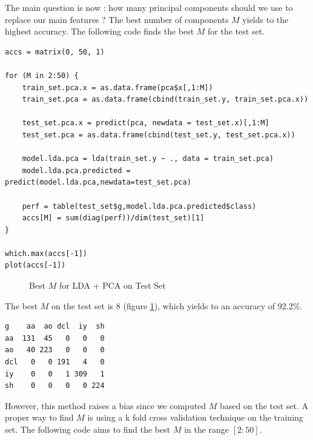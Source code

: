 \documentclass[]{report}
\newcommand{\inputtikz}[2]{%
	\scalebox{#1}{}  
}
\begin{document}
The main question is now : how many principal components should we use to replace our main features ? The best number of components $M$ yields to the highest accuracy. The following code finds the best $M$ for the test set.

\begin{lstlisting}
accs = matrix(0, 50, 1)

for (M in 2:50) {
	train_set.pca.x = as.data.frame(pca$x[,1:M])
	train_set.pca = as.data.frame(cbind(train_set.y, train_set.pca.x))
	
	test_set.pca.x = predict(pca, newdata = test_set.x)[,1:M]
	test_set.pca = as.data.frame(cbind(test_set.y, test_set.pca.x))
	
	model.lda.pca = lda(train_set.y ~ ., data = train_set.pca)
	model.lda.pca.predicted = predict(model.lda.pca,newdata=test_set.pca)
	
	perf = table(test_set$g,model.lda.pca.predicted$class)
	accs[M] = sum(diag(perf))/dim(test_set)[1]
}

which.max(accs[-1])
plot(accs[-1])
\end{lstlisting}

\begin{figure}[!hb]
	\centering
	\inputtikz{0.5}{Figures/lda_pca.tex}
	\caption{Best $M$ for LDA + PCA on Test Set}
	\label{fig:lda_pca}
\end{figure}

The best $M$ on the test set is 8 (figure \ref{fig:lda_pca}), which yields to an accuracy of 92.2\%.

\begin{verbatim}
g    aa  ao dcl  iy  sh
aa  131  45   0   0   0
ao   40 223   0   0   0
dcl   0   0 191   4   0
iy    0   0   1 309   1
sh    0   0   0   0 224
\end{verbatim}

 However, this method raises a bias since we computed $M$ based on the test set. A proper way to find $M$ is using a k fold cross validation technique on the training set. The following code aims to find the best $M$ in the range $[2:50]$.
\end{document}
